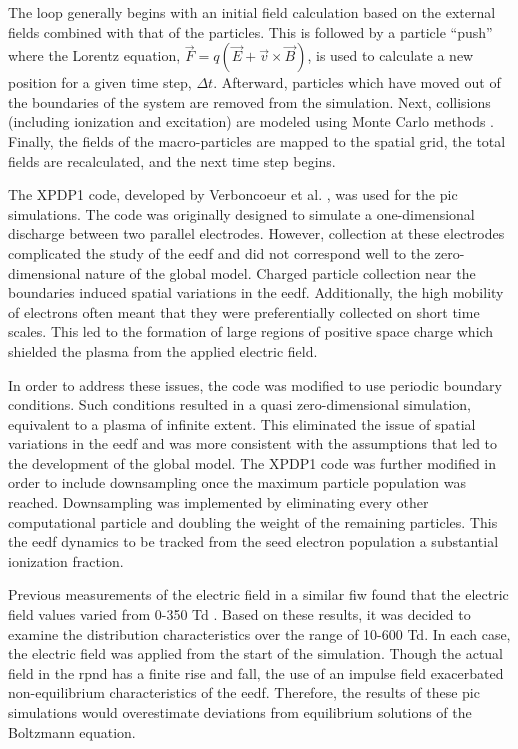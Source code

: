 The loop generally begins with an initial field calculation based on the
external fields combined with that of the particles. This is followed by a
particle ``push'' where the Lorentz equation, $\vec{F} = q(\vec{E} +
\vec{v}\times\vec{B})$, is used to calculate a new position for a given time
step, $\Delta t$. Afterward, particles which have moved out of the boundaries of
the system are removed from the simulation. Next, collisions (including
ionization and excitation) are modeled using Monte Carlo methods
\cite{Birdsall1991}. Finally, the fields of the macro-particles are mapped to
the spatial grid, the total fields are recalculated, and the next time step
begins.

The XPDP1 code, developed by Verboncoeur et al. \cite{Verboncoeur1993}, was used
for the \acs{pic} simulations. The code was originally designed to simulate a
one-dimensional discharge between two parallel electrodes. However, collection
at these electrodes complicated the study of the \acs{eedf} and did not
correspond well to the zero-dimensional nature of the global model. Charged
particle collection near the boundaries induced spatial variations in the
\acs{eedf}. Additionally, the high mobility of electrons often meant that they
were preferentially collected on short time scales. This led to the formation
of large regions of positive space charge which shielded the plasma from the
applied electric field.

In order to address these issues, the code was modified to use periodic boundary
conditions. Such conditions resulted in a quasi zero-dimensional simulation,
equivalent to a plasma of infinite extent. This eliminated the issue of spatial
variations in the \acs{eedf} and was more consistent with the assumptions that
led to the development of the global model. The XPDP1 code was further modified
in order to include downsampling once the maximum particle population was
reached. Downsampling was implemented by eliminating every other computational
particle and doubling the weight of the remaining particles. This the \acs{eedf}
dynamics to be tracked from the seed electron population a substantial
ionization fraction.

Previous measurements of the electric field in a similar \acs{fiw} found that
the electric field values varied from 0-350 Td \cite{Takashima2011}. Based on
these results, it was decided to examine the distribution characteristics over
the range of 10-600 Td. In each case, the electric field was applied from the
start of the simulation. Though the actual field in the \acs{rpnd} has a finite
rise and fall, the use of an impulse field exacerbated non-equilibrium
characteristics of the \acs{eedf}. Therefore, the results of these \acs{pic}
simulations would overestimate deviations from equilibrium solutions of the
Boltzmann equation.

